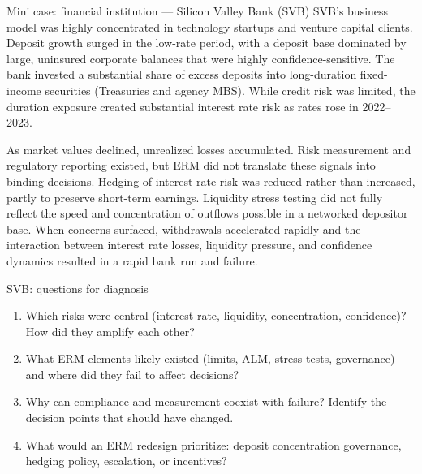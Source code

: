 \documentclass[aspectratio=169, 10pt]{beamer} %
\begin{document}
\begin{frame}{Mini case: financial institution — Silicon Valley Bank (SVB)}
SVB’s business model was highly concentrated in technology startups and venture
capital clients. Deposit growth surged in the low-rate period, with a deposit base
dominated by large, uninsured corporate balances that were highly confidence-sensitive.
The bank invested a substantial share of excess deposits into long-duration fixed-income
securities (Treasuries and agency MBS). While credit risk was limited, the duration
exposure created substantial interest rate risk as rates rose in 2022--2023.

As market values declined, unrealized losses accumulated. Risk measurement and regulatory
reporting existed, but ERM did not translate these signals into binding decisions. Hedging
of interest rate risk was reduced rather than increased, partly to preserve short-term
earnings. Liquidity stress testing did not fully reflect the speed and concentration of
outflows possible in a networked depositor base. When concerns surfaced, withdrawals
accelerated rapidly and the interaction between interest rate losses, liquidity pressure,
and confidence dynamics resulted in a rapid bank run and failure.
\end{frame}

\begin{frame}{SVB: questions for diagnosis}
\begin{enumerate}
  \item Which risks were central (interest rate, liquidity, concentration, confidence)? How did they amplify each other?
  \item What ERM elements likely existed (limits, ALM, stress tests, governance) and where did they fail to affect decisions?
  \item Why can compliance and measurement coexist with failure? Identify the decision points that should have changed.
  \item What would an ERM redesign prioritize: deposit concentration governance, hedging policy, escalation, or incentives?
\end{enumerate}
\end{frame}
\end{document}

